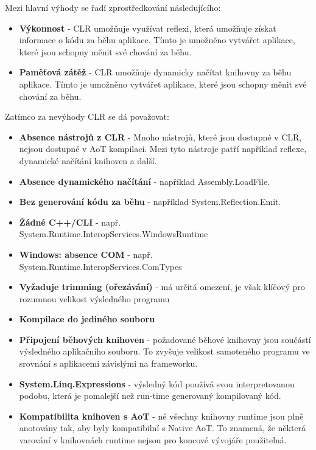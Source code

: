 

Mezi hlavní výhody se řadí zprostředkování následujícího:

\begin{itemize}
    \item  \textbf{Výkonnost} - CLR umožňuje využívat reflexi, která umožňuje získat informace o kódu za běhu aplikace. Tímto je umožněno vytvářet aplikace, které jsou schopny měnit své chování za běhu.
    \item \textbf{Paměťová zátěž} - CLR umožňuje dynamicky načítat knihovny za běhu aplikace. Tímto je umožněno vytvářet aplikace, které jsou schopny měnit své chování za běhu.
\end{itemize}


Zatímco za nevýhody CLR se dá považovat:

\begin{itemize}
    \item  \textbf{Absence nástrojů z CLR} - Mnoho nástrojů, které jsou dostupné v CLR, nejsou dostupné v AoT kompilaci. Mezi tyto nástroje patří například reflexe, dynamické načítání knihoven a další.
    \item \textbf{Absence dynamického načítání} - například Assembly.LoadFile.
    \item \textbf{Bez generování kódu za běhu} - například System.Reflection.Emit.
    \item \textbf{Žádné C++/CLI} - např. System.Runtime.InteropServices.WindowsRuntime
    \item \textbf{Windows: absence COM} - např. System.Runtime.InteropServices.ComTypes
    \item \textbf{Vyžaduje trimming (ořezávání)} - má určitá omezení, je však klíčový pro rozumnou velikost výsledného programu
    \item \textbf{Kompilace do jediného souboru} 
    \item \textbf{Připojení běhových knihoven} - požadované běhové knihovny jsou součástí výsledného aplikačního souboru. To zvyšuje velikost samoteného programu ve srovnání s aplikacemi závislými na frameworku.
    \item \textbf{System.Linq.Expressions} - výsledný kód používá svou interpretovanou podobu, která je pomalejší než run-time generovaný kompilovaný kód.
    \item \textbf{Kompatibilita knihoven s AoT} - né všechny knihovny runtime jsou plně anotovány tak, aby byly kompatibilní s Native AoT. To znamená, že některá varování v knihovnách runtime nejsou pro koncové vývojáře použitelná.
\end{itemize}


